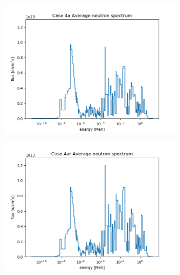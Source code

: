 \documentclass[letterpaper,11pt]{report}
\begin{document}
\begin{figure}[H]
\begin{subfigure}{.33\textwidth}
                \centering
                \includegraphics[width=\linewidth]{../../phase1a/case4a/analysis_output/p1a_4a_f.png}
                \caption{}
              \end{subfigure}
              \begin{subfigure}{.32\textwidth}
                \centering
                \includegraphics[width=\linewidth]{../../phase1a/case4ar/analysis_output/p1a_4ar_f.png}
                \caption{}
              \end{subfigure}
              \begin{subfigure}{.33\textwidth}
                \centering

\end{subfigure}
\end{figure}
\end{document}

